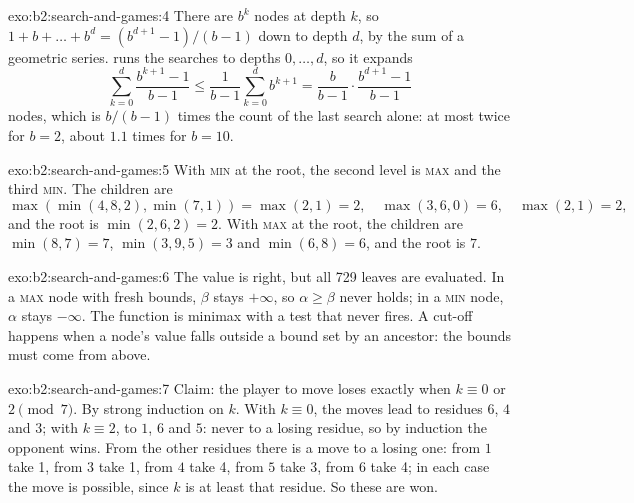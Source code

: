 \begin{solution}{exo:b2:search-and-games:4}
There are $b^k$ nodes at depth $k$, so $1 + b + \dots + b^d = (b^{d+1} - 1)/(b - 1)$ down to depth $d$, by the sum of a
geometric series.  runs the searches to depths $0, \dots, d$, so it expands
\[
\sum_{k=0}^{d} \frac{b^{k+1} - 1}{b - 1} \leq \frac{1}{b - 1} \sum_{k=0}^{d} b^{k+1} = \frac{b}{b - 1} \cdot \frac{b^{d+1}
- 1}{b - 1}
\]
nodes, which is $b/(b - 1)$ times the count of the last search alone: at most twice for $b = 2$, about $1.1$ times for
$b = 10$.
\end{solution}

\begin{solution}{exo:b2:search-and-games:5}
With \textsc{min} at the root, the second level is \textsc{max} and the third \textsc{min}. The children are
\[
\max(\min(4, 8, 2), \min(7, 1)) = \max(2, 1) = 2, \quad \max(3, 6, 0) = 6, \quad \max(2, 1) = 2,
\]
and the root is $\min(2, 6, 2) = 2$. With \textsc{max} at the root, the children are $\min(8, 7) = 7$, $\min(3, 9, 5) = 3$ and
$\min(6, 8) = 6$, and the root is $7$.

\end{solution}

\begin{solution}{exo:b2:search-and-games:6}
The value is right, but all 729 leaves are evaluated. In a \textsc{max} node with fresh bounds, $\beta$ stays $+\infty$, so
$\alpha \geq \beta$ never holds; in a \textsc{min} node, $\alpha$ stays $-\infty$. The function is minimax with a test that
never fires. A cut-off happens when a node's value falls outside a bound set by an ancestor: the bounds must come from
above.
\end{solution}

\begin{solution}{exo:b2:search-and-games:7}
Claim: the player to move loses exactly when $k \equiv 0$ or $2 \pmod 7$. By strong induction on $k$. With $k \equiv 0$,
the moves lead to residues $6$, $4$ and $3$; with $k \equiv 2$, to $1$, $6$ and $5$: never to a losing residue, so by
induction the opponent wins. From the other residues there is a move to a losing one: from $1$ take 1, from $3$ take 1,
from $4$ take 4, from $5$ take 3, from $6$ take 4; in each case the move is possible, since $k$ is at least that residue.
So these  are won.
\end{solution}


